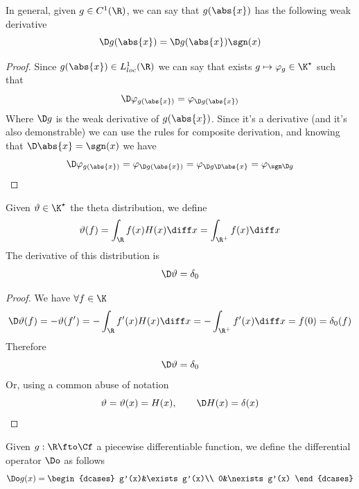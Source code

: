 \documentclass[../mmf.tex]{subfiles}
\begin{document}
\begin{thm}
	In general, given $g\in C^1(\R)$, we can say that $g(\abs{x})$ has the following weak derivative
	\begin{equation*}
		\D g(\abs{x})=\D g(\abs{x})\sgn(x)
	\end{equation*}
\end{thm}
\begin{proof}
	Since $g(\abs{x})\in L^1_{loc}(\R)$ we can say that exists $g\mapsto\varphi_g\in\K^\star$ such that
	\begin{equation*}
		\D\varphi_{g(\abs{x})}=\varphi_{\D g(\abs{x})}
	\end{equation*}
	Where $\D g$ is the weak derivative of $g(\abs{x})$. Since it's a derivative (and it's also demonstrable) we can use the rules for composite derivation, and knowing that $\D\abs{x}=\sgn(x)$ we have
	\begin{equation*}
		\D\varphi_{g(\abs{x})}=\varphi_{\D g(\abs{x})}=\varphi_{\D g\D\abs{x}}=\varphi_{\sgn\D g}
	\end{equation*}
\end{proof}
\begin{thm}
	Given $\vartheta\in\K^\star$ the theta distribution, we define
	\begin{equation*}
		\vartheta(f)=\int_{\R} f(x)H(x)\diff x=\int_{\R^+}^{}f(x)\diff x
	\end{equation*}
	The derivative of this distribution is
	\begin{equation*}
		\D\vartheta=\delta_0
	\end{equation*}
\end{thm}
\begin{proof}
	We have $\forall f\in\K$
	\begin{equation*}
		\D\vartheta(f)=-\vartheta(f')=-\int_{\R}^{}f'(x)H(x)\diff x=-\int_{\R^+}f'(x)\diff x=f(0)=\delta_0(f)
	\end{equation*}
	Therefore
	\begin{equation*}
		\D\vartheta=\delta_0
	\end{equation*}
	Or, using a common abuse of notation
	\begin{equation*}
		\vartheta=\vartheta(x)=H(x),\qquad \D H(x)=\delta(x)
	\end{equation*}
\end{proof}
\begin{ntn}
	Given $g:\R\fto\Cf$ a piecewise differentiable function, we define the differential operator $\Do$ as follows
	\begin{equation}
		\Do g(x)=\begin{dcases}
			g'(x)&\exists g'(x)\\
			0&\nexists g'(x)
		\end{dcases}
		\label{eq:dodoperator}
	\end{equation}
\end{ntn}
\end{document}
